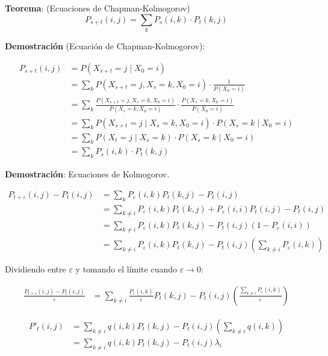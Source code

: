 \documentclass[12pt,a4paper]{article}
\newcommand{\teorema}[1]{%
\begin{teoremabox}
\textbf{Teorema}: #1
\end{teoremabox}
}
\begin{document}

\teorema{(Ecuaciones de Chapman-Kolmogorov)
\begin{equation*}
P_{s+t}(i,j) = \sum_{k} P_s(i,k) \cdot P_t(k,j)
\end{equation*}
}

\textbf{Demostración} (Ecuación de Chapman-Kolmogorov):

\begin{align*}
P_{s+t}(i,j) &= P(X_{s+t} = j \mid X_0 = i) \\
&= \sum_{k} P(X_{s+t} = j, X_s = k, X_0 = i) \cdot \frac{1}{P(X_0 = i)} \\
&= \sum_{k} \frac{P(X_{s+t} = j, X_s = k, X_0 = i)}{P(X_s = k, X_0 = i)} \cdot \frac{P(X_s = k, X_0 = i)}{P(X_0 = i)} \\
&= \sum_{k} P(X_{s+t} = j \mid X_s = k, X_0 = i) \cdot P(X_s = k \mid X_0 = i) \\
&= \sum_{k} P(X_t = j \mid X_s = k) \cdot P(X_s = k \mid X_0 = i) \\
&= \sum_{k} P_s(i,k) \cdot P_t(k,j)
\end{align*}


\textbf{Demostración}: Ecuaciones de Kolmogorov.

\begin{align*}
P_{t+\varepsilon}(i,j) - P_t(i,j) &= \sum_{k} P_\varepsilon(i,k) P_t(k,j) - P_t(i,j) \\
&= \sum_{k \neq i} P_\varepsilon(i,k) P_t(k,j) + P_\varepsilon(i,i) P_t(i,j) - P_t(i,j) \\
&= \sum_{k \neq i} P_\varepsilon(i,k) P_t(k,j) - P_t(i,j)(1 - P_\varepsilon(i,i)) \\
&= \sum_{k \neq i} P_\varepsilon(i,k) P_t(k,j) - P_t(i,j) \left(\sum_{k \neq i} P_\varepsilon(i,k)\right)
\end{align*}

Dividiendo entre $\varepsilon$ y tomando el límite cuando $\varepsilon \to 0$:

\begin{align*}
\frac{P_{t+\varepsilon}(i,j) - P_t(i,j)}{\varepsilon} &= \sum_{k \neq i} \frac{P_\varepsilon(i,k)}{\varepsilon} P_t(k,j) - P_t(i,j) \left(\frac{\sum_{k \neq i} P_\varepsilon(i,k)}{\varepsilon}\right)
\end{align*}

\begin{align*}
P'_t(i,j) &= \sum_{k \neq i} q(i,k) P_t(k,j) - P_t(i,j) \left(\sum_{k \neq i} q(i,k)\right) \\
&= \sum_{k \neq i} q(i,k) P_t(k,j) - P_t(i,j) \lambda_i
\end{align*}
\end{document}
